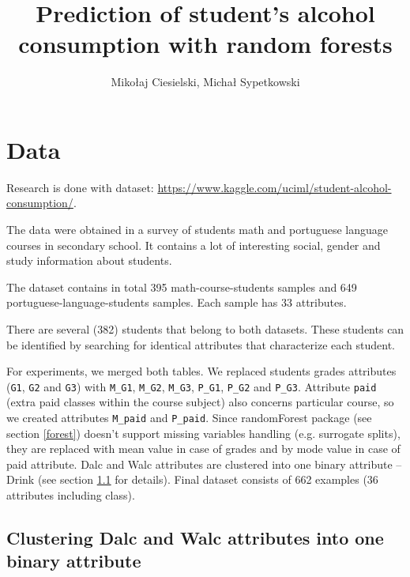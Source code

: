 \documentclass[a4paper]{article}
\begin{document}
\title{Prediction of student's alcohol consumption with random forests}

\author{Mikołaj Ciesielski, Michał Sypetkowski}
\setlength\columnsep{0.375in}  \newlength\titlebox \setlength\titlebox{2.25in}
\twocolumn
\maketitle



\section{Data}
\label{data}

Research is done with dataset: \url{https://www.kaggle.com/uciml/student-alcohol-consumption/}.

The data were obtained in a survey of students
math and portuguese language courses in secondary school.
It contains a lot of interesting social,
gender and study information about students.

The dataset contains in total 395 math-course-students samples and 
649 portuguese-language-students samples. Each sample has 33 attributes.

There are several (382) students that belong to both datasets.
These students can be identified by searching for identical attributes
that characterize each student.

For experiments, we merged both tables.
We replaced students grades attributes
(\texttt{G1}, \texttt{G2} and \texttt{G3})
with
\texttt{M\_G1},
\texttt{M\_G2},
\texttt{M\_G3},
\texttt{P\_G1},
\texttt{P\_G2} and
\texttt{P\_G3}.
    Attribute \texttt{paid} (extra paid classes within the course subject) also concerns particular course, so we created attributes
\texttt{M\_paid} and \texttt{P\_paid}.
Since randomForest package (see section \ref{forest}) doesn't support missing variables handling (e.g. surrogate splits),
they are replaced with mean value in case of grades and by mode value in case of paid attribute.
Dalc and Walc attributes are clustered into one binary attribute -- Drink (see section \ref{clust} for details).
Final dataset consists of 662 examples (36 attributes including class).

\subsection{Clustering Dalc and Walc attributes into one binary attribute}
\label{clust}
\end{document}
